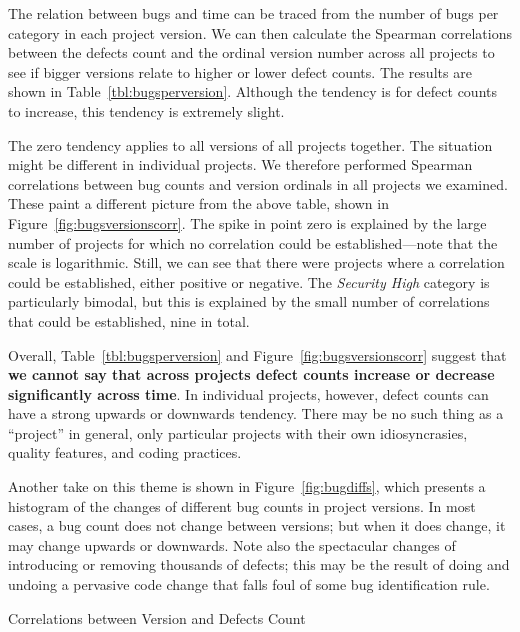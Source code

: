 \documentclass{sig-alternate}
\begin{document}
The relation between bugs and time can be traced from the number of
bugs per category in each project version. We can then calculate the
Spearman correlations between the defects count and the ordinal
version number across all projects to see if bigger versions relate to
higher or lower defect counts. The results are shown in
Table~\ref{tbl:bugsperversion}. Although the tendency is for defect
counts to increase, this tendency is extremely slight.

The zero tendency applies to all versions of all projects together. 
The situation might be different in individual projects. We therefore
performed Spearman correlations between bug counts and version
ordinals in all projects we examined. These paint a different picture
from the above table, shown in Figure~\ref{fig:bugsversionscorr}. The
spike in point zero is explained by the large number of projects for
which no correlation could be established---note that the scale is
logarithmic. Still, we can see that there were projects where a
correlation could be established, either positive or negative. The
{\it Security High} category is particularly bimodal, but this is
explained by the small number of correlations that could be
established, nine in total.

Overall, Table~\ref{tbl:bugsperversion} and
Figure~\ref{fig:bugsversionscorr} suggest that \textbf{we cannot say that
across projects defect counts increase or decrease significantly
across time}. In individual projects, however, defect counts can have a
strong upwards or downwards tendency. There may be no such thing as a
``project'' in general, only particular projects with their own
idiosyncrasies, quality features, and coding practices.

Another take on this theme is shown in Figure~\ref{fig:bugdiffs},
which presents a histogram of the changes of different bug counts in
project versions. In most cases, a bug count does not change between
versions; but when it does change, it may change upwards or downwards.
Note also the spectacular changes of introducing or removing thousands
of defects; this may be the result of doing and undoing a pervasive
code change that falls foul of some bug identification rule.

\begin{table}[t]
    \centering
    \caption{Correlations between Version and Defects Count}
    \label{tbl:bugsperversion}
    
\end{table}
\end{document}
